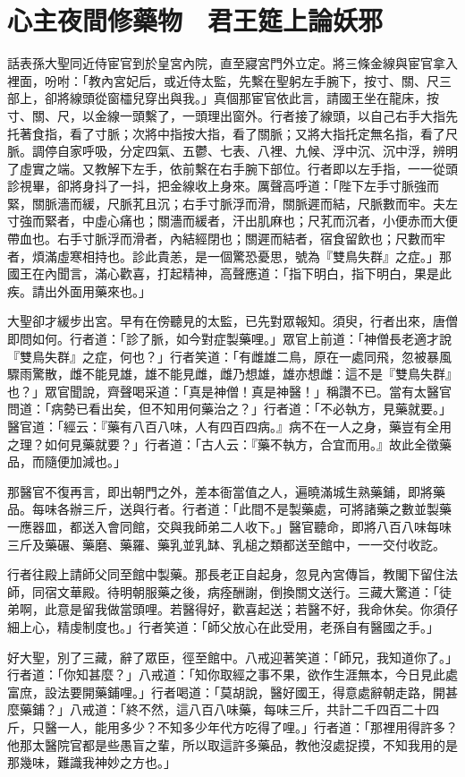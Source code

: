 
\chapter{心主夜間修藥物　君王筵上論妖邪}

話表孫大聖同近侍宦官到於皇宮內院，直至寢宮門外立定。將三條金線與宦官拿入裡面，吩咐：「教內宮妃后，或近侍太監，先繫在聖躬左手腕下，按寸、關、尺三部上，卻將線頭從窗櫺兒穿出與我。」真個那宦官依此言，請國王坐在龍床，按寸、關、尺，以金線一頭繫了，一頭理出窗外。行者接了線頭，以自己右手大指先托著食指，看了寸脈；次將中指按大指，看了關脈；又將大指托定無名指，看了尺脈。調停自家呼吸，分定四氣、五鬱、七表、八裡、九候、浮中沉、沉中浮，辨明了虛實之端。又教解下左手，依前繫在右手腕下部位。行者即以左手指，一一從頭診視畢，卻將身抖了一抖，把金線收上身來。厲聲高呼道：「陛下左手寸脈強而緊，關脈濇而緩，尺脈芤且沉；右手寸脈浮而滑，關脈遲而結，尺脈數而牢。夫左寸強而緊者，中虛心痛也；關濇而緩者，汗出肌麻也；尺芤而沉者，小便赤而大便帶血也。右手寸脈浮而滑者，內結經閉也；關遲而結者，宿食留飲也；尺數而牢者，煩滿虛寒相持也。診此貴恙，是一個驚恐憂思，號為『雙鳥失群』之症。」那國王在內聞言，滿心歡喜，打起精神，高聲應道：「指下明白，指下明白，果是此疾。請出外面用藥來也。」

大聖卻才緩步出宮。早有在傍聽見的太監，已先對眾報知。須臾，行者出來，唐僧即問如何。行者道：「診了脈，如今對症製藥哩。」眾官上前道：「神僧長老適才說『雙鳥失群』之症，何也？」行者笑道：「有雌雄二鳥，原在一處同飛，忽被暴風驟雨驚散，雌不能見雄，雄不能見雌，雌乃想雄，雄亦想雌：這不是『雙鳥失群』也？」眾官聞說，齊聲喝采道：「真是神僧！真是神醫！」稱讚不已。當有太醫官問道：「病勢已看出矣，但不知用何藥治之？」行者道：「不必執方，見藥就要。」醫官道：「經云：『藥有八百八味，人有四百四病。』病不在一人之身，藥豈有全用之理？如何見藥就要？」行者道：「古人云：『藥不執方，合宜而用。』故此全徵藥品，而隨便加減也。」

那醫官不復再言，即出朝門之外，差本衙當值之人，遍曉滿城生熟藥鋪，即將藥品。每味各辦三斤，送與行者。行者道：「此間不是製藥處，可將諸藥之數並製藥一應器皿，都送入會同館，交與我師弟二人收下。」醫官聽命，即將八百八味每味三斤及藥碾、藥磨、藥羅、藥乳並乳缽、乳槌之類都送至館中，一一交付收訖。

行者往殿上請師父同至館中製藥。那長老正自起身，忽見內宮傳旨，教閣下留住法師，同宿文華殿。待明朝服藥之後，病痊酬謝，倒換關文送行。三藏大驚道：「徒弟啊，此意是留我做當頭哩。若醫得好，歡喜起送；若醫不好，我命休矣。你須仔細上心，精虔制度也。」行者笑道：「師父放心在此受用，老孫自有醫國之手。」

好大聖，別了三藏，辭了眾臣，徑至館中。八戒迎著笑道：「師兄，我知道你了。」行者道：「你知甚麼？」八戒道：「知你取經之事不果，欲作生涯無本，今日見此處富庶，設法要開藥鋪哩。」行者喝道：「莫胡說，醫好國王，得意處辭朝走路，開甚麼藥鋪？」八戒道：「終不然，這八百八味藥，每味三斤，共計二千四百二十四斤，只醫一人，能用多少？不知多少年代方吃得了哩。」行者道：「那裡用得許多？他那太醫院官都是些愚盲之輩，所以取這許多藥品，教他沒處捉摸，不知我用的是那幾味，難識我神妙之方也。」

